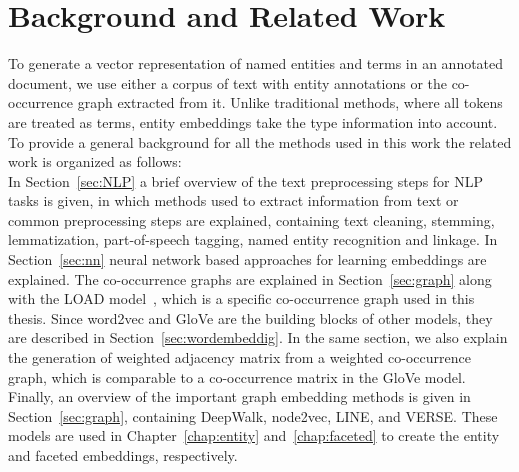 
\chapter{Background and Related Work}\label{chap:background}
To generate a vector representation of named entities and terms in an annotated document, we use either a corpus of text with entity annotations or the co-occurrence graph extracted from it. Unlike traditional methods, where all tokens are treated as terms, entity embeddings take the type information into account. To provide a general background for all the methods used in this work the related work is organized as follows:\\
In Section~\ref{sec:NLP} a brief overview of the text preprocessing steps for NLP tasks is given, in which methods used to extract information from text or common preprocessing steps are explained, containing text cleaning, stemming, lemmatization, part-of-speech tagging, named entity recognition and linkage. In Section~\ref{sec:nn} neural network based approaches for learning embeddings are explained. The co-occurrence graphs are explained in Section~\ref{sec:graph} along with the LOAD model~, which is a specific co-occurrence graph used in this thesis. Since word2vec and GloVe are the building blocks of other models, they are described in Section~\ref{sec:wordembeddig}. In the same section, we also explain the generation of  weighted adjacency matrix from a weighted co-occurrence graph, which is comparable to a co-occurrence matrix in the GloVe model.  Finally, an overview of the important graph embedding methods is given in Section~\ref{sec:graph}, containing DeepWalk, node2vec, LINE, and VERSE. These models are used  in Chapter~\ref{chap:entity} and~\ref{chap:faceted} to create the entity and faceted embeddings, respectively. 

